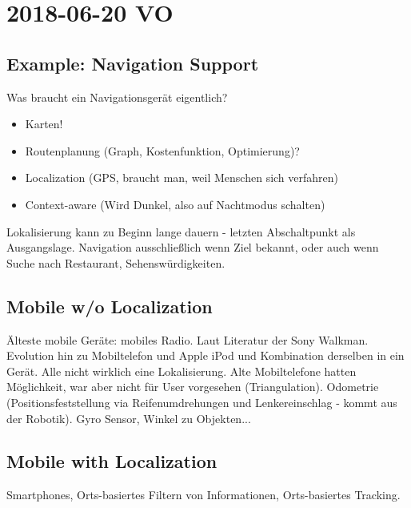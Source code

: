 \section{2018-06-20 VO}

\subsection{Example: Navigation Support}
Was braucht ein Navigationsgerät eigentlich?
\begin{itemize}
\item Karten!
\item Routenplanung (Graph, Kostenfunktion, Optimierung)? 
\item Localization (GPS, braucht man, weil Menschen sich verfahren)
\item Context-aware (Wird Dunkel, also auf Nachtmodus schalten)
\end{itemize}
Lokalisierung kann zu Beginn lange dauern - letzten Abschaltpunkt als Ausgangslage.
Navigation ausschließlich wenn Ziel bekannt, oder auch wenn Suche nach Restaurant, Sehenswürdigkeiten.
\noindent{}
\noindent{}
\subsection{Mobile w/o Localization}
Älteste mobile Geräte: mobiles Radio. Laut Literatur der Sony Walkman.
Evolution hin zu Mobiltelefon und Apple iPod und Kombination derselben in ein Gerät.
Alle nicht wirklich eine Lokalisierung. Alte Mobiltelefone hatten Möglichkeit, war aber nicht für User vorgesehen (Triangulation). 
Odometrie (Positionsfeststellung via Reifenumdrehungen und Lenkereinschlag - kommt aus der Robotik). 
Gyro Sensor, Winkel zu Objekten...
\subsection{Mobile with Localization}
Smartphones, Orts-basiertes Filtern von Informationen, Orts-basiertes Tracking.
